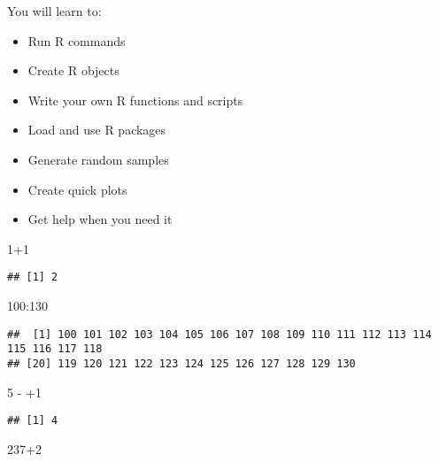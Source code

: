 \documentclass[
]{article}
\newenvironment{Shaded}{\begin{snugshade}}{\end{snugshade}}
\newcommand{\DecValTok}[1]{\textcolor[rgb]{0.00,0.00,0.81}{#1}}
\newcommand{\SpecialCharTok}[1]{\textcolor[rgb]{0.00,0.00,0.00}{#1}}
\providecommand{\tightlist}{%
  \setlength{\itemsep}{0pt}\setlength{\parskip}{0pt}}
\begin{document}
You will learn to:

\begin{itemize}
\tightlist
\item
  Run R commands
\item
  Create R objects
\item
  Write your own R functions and scripts
\item
  Load and use R packages
\item
  Generate random samples
\item
  Create quick plots
\item
  Get help when you need it
\end{itemize}

\begin{Shaded}
\begin{Highlighting}[]
\DecValTok{1}\SpecialCharTok{+}\DecValTok{1}
\end{Highlighting}
\end{Shaded}

\begin{verbatim}
## [1] 2
\end{verbatim}

\begin{Shaded}
\begin{Highlighting}[]
\DecValTok{100}\SpecialCharTok{:}\DecValTok{130}
\end{Highlighting}
\end{Shaded}

\begin{verbatim}
##  [1] 100 101 102 103 104 105 106 107 108 109 110 111 112 113 114 115 116 117 118
## [20] 119 120 121 122 123 124 125 126 127 128 129 130
\end{verbatim}

\begin{Shaded}
\begin{Highlighting}[]
\DecValTok{5} \SpecialCharTok{{-}} 
  \SpecialCharTok{+}\DecValTok{1}
\end{Highlighting}
\end{Shaded}

\begin{verbatim}
## [1] 4
\end{verbatim}

\begin{Shaded}
\begin{Highlighting}[]
\DecValTok{237}\SpecialCharTok{+}\DecValTok{2}
\end{Highlighting}
\end{Shaded}
\end{document}
